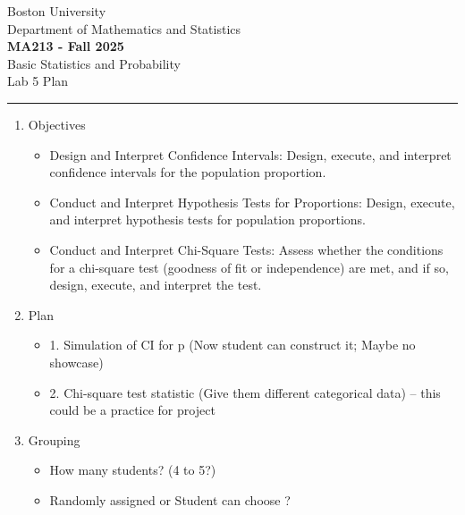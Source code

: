 \documentclass[12pt]{article}
\begin{document}
	
	
	
	\begin{center}		
        Boston University \\
        Department of Mathematics and Statistics \\ 
		\Large{\textbf{MA213 - Fall 2025}} \\ 
        \large{Basic Statistics and Probability} \\
        \large{Lab 5 Plan} \\ 
		\noindent\rule{16cm}{2pt}
	\end{center}
	
\begin{enumerate}
    \item Objectives
    \begin{itemize}
        \item Design and Interpret Confidence Intervals: Design, execute, and interpret confidence intervals for the population proportion.
        \item Conduct and Interpret Hypothesis Tests for Proportions: Design, execute, and interpret hypothesis tests for population proportions.
        \item Conduct and Interpret Chi-Square Tests: Assess whether the conditions for a chi-square test (goodness of fit or independence) are met, and if so, design, execute, and interpret the test. 
    \end{itemize}
    \item Plan
    \begin{itemize}
        \item 1. Simulation of CI for p (Now student can construct it; Maybe no showcase)
        \item 2. Chi-square test statistic (Give them different categorical data) -- this could be a practice for project
    \end{itemize}

    \item  Grouping 
    \begin{itemize}
        \item How many students? (4 to 5?)
        \item Randomly assigned or Student can choose ? 
    \end{itemize}
    


\end{enumerate}
    
\end{document}

